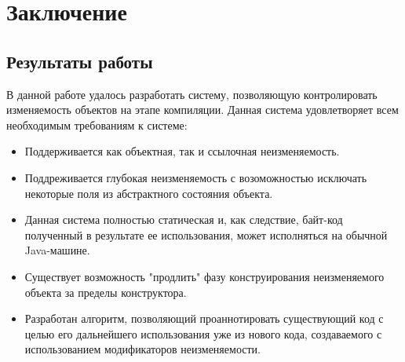 \chapter{Заключение}

\section{Результаты работы}

В данной работе удалось разработать систему, позволяющую контролировать изменяемость объектов на этапе компиляции. Данная система удовлетворяет всем необходимым требованиям к системе:
\begin{itemize}
	\item Поддерживается как объектная, так и ссылочная неизменяемость.
	\item Поддреживается глубокая неизменяемость с возоможностью исключать некоторые поля из абстрактного состояния объекта.
	\item Данная система полностью статическая и, как следствие, байт-код полученный в результате ее использования, может исполняться на обычной Java-машине.
	\item Существует возможность "продлить" фазу конструирования неизменяемого объекта за пределы конструктора.
	\item Разработан алгоритм, позволяющий проаннотировать существующий код с целью его дальнейшего использования уже из нового кода, создаваемого с использованием модификаторов неизменяемости.	  
\end{itemize}



